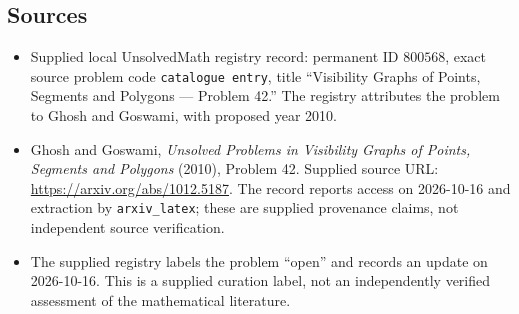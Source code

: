 \documentclass[11pt]{article}
\begin{document}
\subsection{Sources}
\begin{itemize}
\item Supplied local UnsolvedMath registry record: permanent ID \(800568\), exact source problem code \texttt{catalogue entry}, title ``Visibility Graphs of Points, Segments and Polygons --- Problem 42.'' The registry attributes the problem to Ghosh and Goswami, with proposed year 2010.
\item Ghosh and Goswami, \emph{Unsolved Problems in Visibility Graphs of Points, Segments and Polygons} (2010), Problem 42. Supplied source URL: \url{https://arxiv.org/abs/1012.5187}. The record reports access on 2026-10-16 and extraction by \texttt{arxiv\_latex}; these are supplied provenance claims, not independent source verification.
\item The supplied registry labels the problem ``open'' and records an update on 2026-10-16. This is a supplied curation label, not an independently verified assessment of the mathematical literature.
\end{itemize}
\end{document}
